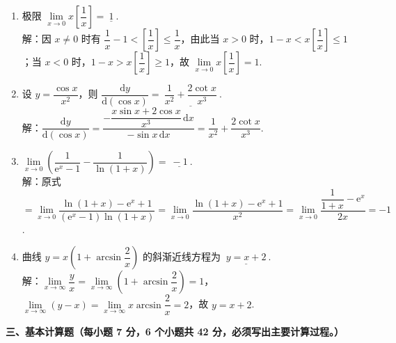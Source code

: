 \documentclass[a4paper,11pt]{ctexart}
\newcommand{\e}{\mathrm{e}}
\newcommand{\dd}{\mathrm{d}}
\begin{document}
\begin{enumerate}[label=\arabic*., start=7, leftmargin=2em, itemsep=0.8em, topsep=0.5em]
  \item 极限 $\lim\limits_{x\to 0} x\left[\dfrac{1}{x}\right] = \underline{\ 1\ }$.\\[0.3em]
  解：因 $x\neq 0$ 时有 $\dfrac{1}{x} - 1 < \left[\dfrac{1}{x}\right] \le \dfrac{1}{x}$，由此当 $x > 0$ 时，$1 - x < x\left[\dfrac{1}{x}\right] \le 1$；当 $x < 0$ 时，$1 - x > x\left[\dfrac{1}{x}\right] \ge 1$，故 $\lim\limits_{x\to 0} x\left[\dfrac{1}{x}\right] = 1$.

  \item 设 $y = \dfrac{\cos x}{x^2}$，则 $\dfrac{\dd y}{\dd(\cos x)} = \underline{\ \dfrac{1}{x^2} + \dfrac{2\cot x}{x^3}\ }$.\\[0.3em]
  解：$\dfrac{\dd y}{\dd(\cos x)} = \dfrac{-\dfrac{x\sin x + 2\cos x}{x^3}\,\dd x}{-\sin x\,\dd x} = \dfrac{1}{x^2} + \dfrac{2\cot x}{x^3}$.

  \item $\lim\limits_{x\to 0}\left(\dfrac{1}{\e^x - 1} - \dfrac{1}{\ln(1+x)}\right) = \underline{\ -1\ }$.\\[0.3em]
  解：原式 $= \lim\limits_{x\to 0}\dfrac{\ln(1+x) - \e^x + 1}{(\e^x - 1)\ln(1+x)} = \lim\limits_{x\to 0}\dfrac{\ln(1+x) - \e^x + 1}{x^2} = \lim\limits_{x\to 0}\dfrac{\dfrac{1}{1+x} - \e^x}{2x} = -1$.

  \item 曲线 $y = x\left(1 + \arcsin\dfrac{2}{x}\right)$ 的斜渐近线方程为 $\underline{\ y = x + 2\ }$.\\[0.3em]
  解：$\lim\limits_{x\to\infty}\dfrac{y}{x} = \lim\limits_{x\to\infty}\left(1 + \arcsin\dfrac{2}{x}\right) = 1$，$\lim\limits_{x\to\infty}(y - x) = \lim\limits_{x\to\infty} x\arcsin\dfrac{2}{x} = 2$，故 $y = x + 2$.
\end{enumerate}

\vspace{0.8em}

\textbf{三、基本计算题（每小题 7 分，6 个小题共 42 分，必须写出主要计算过程。）}
\end{document}

